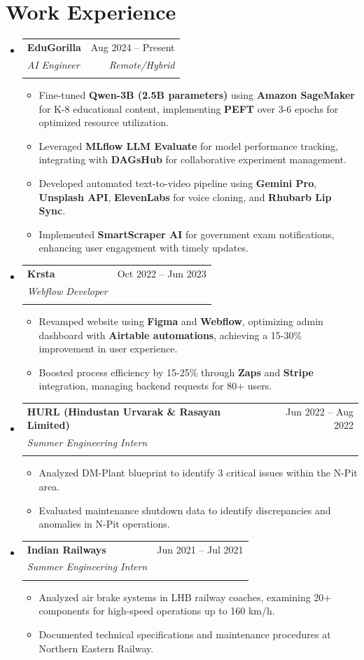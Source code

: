 \documentclass[A4paper,5pt]{article}
\makeatletter
\renewcommand{\resumeItem}[1]{%
  \item\small{#1 \vspace{-2pt}}%
}
\newcommand{\resumeSubheading}[4]{%
  \vspace{-1pt}\item
    \begin{tabular*}{0.97\textwidth}{l@{\extracolsep{\fill}}r}
      \textbf{#1} & #2 \\
      \if\relax\detokenize{#3}\relax
      \else
        \textit{#3} & \textit{#4} \\
      \fi
    \end{tabular*}\vspace{-5pt}
}
\newcommand{\resumeSubHeadingListStart}{\begin{itemize}[leftmargin=*]}
\newcommand{\resumeSubHeadingListEnd}{\end{itemize}}
\newcommand{\resumeItemListStart}{\begin{itemize}}
\newcommand{\resumeItemListEnd}{\end{itemize}\vspace{-5pt}}
\makeatother
\begin{document}
\section{Work Experience}
  \resumeSubHeadingListStart
    \resumeSubheading
      {EduGorilla}{Aug 2024 -- Present}
      {AI Engineer}{Remote/Hybrid}
      \resumeItemListStart
        \resumeItem{Fine-tuned \textbf{Qwen-3B (2.5B parameters)} using \textbf{Amazon SageMaker} for K-8 educational content, implementing \textbf{PEFT} over 3-6 epochs for optimized resource utilization.}
        \resumeItem{Leveraged \textbf{MLflow LLM Evaluate} for model performance tracking, integrating with \textbf{DAGsHub} for collaborative experiment management.}
        \resumeItem{Developed automated text-to-video pipeline using \textbf{Gemini Pro}, \textbf{Unsplash API}, \textbf{ElevenLabs} for voice cloning, and \textbf{Rhubarb Lip Sync}.}
        \resumeItem{Implemented \textbf{SmartScraper AI} for government exam notifications, enhancing user engagement with timely updates.}
      \resumeItemListEnd

    \resumeSubheading
      {Krsta}{Oct 2022 -- Jun 2023}
      {Webflow Developer}{}
      \resumeItemListStart
        \resumeItem{Revamped website using \textbf{Figma} and \textbf{Webflow}, optimizing admin dashboard with \textbf{Airtable automations}, achieving a 15-30\% improvement in user experience.}
        \resumeItem{Boosted process efficiency by 15-25\% through \textbf{Zaps} and \textbf{Stripe} integration, managing backend requests for 80+ users.}
      \resumeItemListEnd

    \resumeSubheading
      {HURL (Hindustan Urvarak \& Rasayan Limited)}{Jun 2022 -- Aug 2022}
      {Summer Engineering Intern}{}
      \resumeItemListStart
        \resumeItem{Analyzed DM-Plant blueprint to identify 3 critical issues within the N-Pit area.}
        \resumeItem{Evaluated maintenance shutdown data to identify discrepancies and anomalies in N-Pit operations.}
      \resumeItemListEnd

    \resumeSubheading
      {Indian Railways}{Jun 2021 -- Jul 2021}
      {Summer Engineering Intern}{}
      \resumeItemListStart
        \resumeItem{Analyzed air brake systems in LHB railway coaches, examining 20+ components for high-speed operations up to 160 km/h.}
        \resumeItem{Documented technical specifications and maintenance procedures at Northern Eastern Railway.}
      \resumeItemListEnd

  \resumeSubHeadingListEnd
\vspace{-5pt}
\end{document}
